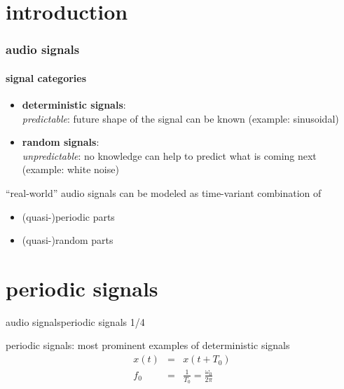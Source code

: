     \section[intro]{introduction}
        \begin{frame}\frametitle{audio signals}\framesubtitle{signal categories}
            \begin{itemize}
                \item	\textbf{deterministic signals}:\\
                        \textit{predictable}: future shape of the signal can be known (example: sinusoidal)
                \pause		
                \item	\textbf{random signals}:\\
                        \textit{unpredictable}: no knowledge can help to predict what is coming next (example: white noise)
            \end{itemize}
            
            \bigskip
            \pause
            ``real-world'' audio signals can be modeled as time-variant combination of 
            \begin{itemize}
                \item	(quasi-)periodic parts
                \item	(quasi-)random parts
            \end{itemize}
        \end{frame}

    \section[periodic]{periodic signals}
        \begin{frame}{audio signals}{periodic signals 1/4}

            periodic signals: most prominent examples of deterministic signals
            \begin{eqnarray*}
                x(t) 	&=& x(t+T_0)\\
                f_0 	&=& \frac{1}{T_0} =  \frac{\omega_0}{2\pi}
            \end{eqnarray*}
            \vspace{-9mm}

        \end{frame}


